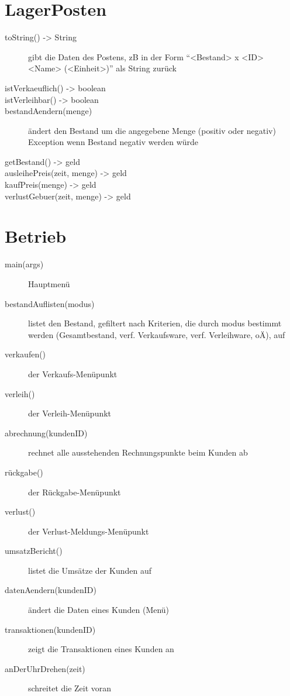 \documentclass[a4paper,12pt]{report}
\begin{document}
\section{LagerPosten}
\begin{description}
\item[toString() -> String]
gibt die Daten des Postens, zB in der Form \enquote{<Bestand> x <ID> <Name> (<Einheit>)} als String zurück
\item[istVerkaeuflich() -> boolean]
\item[istVerleihbar() -> boolean]
\item[bestandAendern(menge)]
ändert den Bestand um die angegebene Menge (positiv oder negativ) \\
Exception wenn Bestand negativ werden würde
\item[getBestand() -> geld]
\item[ausleihePreis(zeit, menge) -> geld]
\item[kaufPreis(menge) -> geld]
\item[verlustGebuer(zeit, menge) -> geld]
\end{description}
\section{Betrieb}
\begin{description}
\item[main(args)]
Hauptmenü
\item[bestandAuflisten(modus)]
listet den Bestand, gefiltert nach Kriterien, die durch modus bestimmt werden (Gesamtbestand, verf. Verkaufsware, verf. Verleihware, oÄ), auf
\item[verkaufen()]
der Verkaufs-Menüpunkt
\item[verleih()]
der Verleih-Menüpunkt
\item[abrechnung(kundenID)]
rechnet alle ausstehenden Rechnungspunkte beim Kunden ab
\item[rückgabe()]
der Rückgabe-Menüpunkt
\item[verlust()]
der Verlust-Meldungs-Menüpunkt
\item[umsatzBericht()]
listet die Umsätze der Kunden auf
\item[datenAendern(kundenID)]
ändert die Daten eines Kunden (Menü)
\item[transaktionen(kundenID)]
zeigt die Transaktionen eines Kunden an
\item[anDerUhrDrehen(zeit)]
schreitet die Zeit voran
\end{description}
\end{document}
